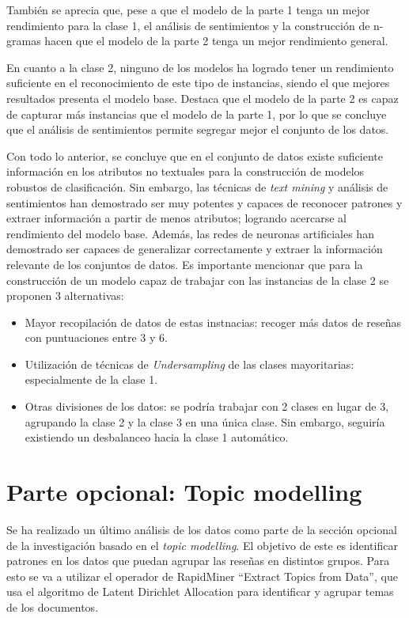 \documentclass[es]{uc3mreport}
\begin{document}
\begin{report}
También se aprecia que, pese a que el modelo de la parte 1 tenga un mejor
rendimiento para la clase 1, el análisis de sentimientos y la construcción de
n-gramas hacen que el modelo de la parte 2 tenga un mejor rendimiento general.

En cuanto a la clase 2, ninguno de los modelos ha logrado tener un rendimiento
suficiente en el reconocimiento de este tipo de instancias, siendo el que
mejores resultados presenta el modelo base. Destaca que el modelo de la parte 2
es capaz de capturar más instancias que el modelo de la parte 1, por lo que se
concluye que el análisis de sentimientos permite segregar mejor el conjunto de
los datos.

Con todo lo anterior, se concluye que en el conjunto de datos existe suficiente
información en los atributos no textuales para la construcción de modelos
robustos de clasificación. Sin embargo, las técnicas de \textit{text mining} y
análisis de sentimientos han demostrado ser muy potentes y capaces de reconocer
patrones y extraer información a partir de menos atributos; logrando acercarse
al rendimiento del modelo base. Además, las redes de neuronas artificiales han
demostrado ser capaces de generalizar correctamente y extraer la información
relevante de los conjuntos de datos. Es importante mencionar que para la
construcción de un modelo capaz de trabajar con las instancias de la clase 2 se
proponen 3 alternativas:

\begin{itemize}
    \item Mayor recopilación de datos de estas instnacias: recoger más datos de
    reseñas con puntuaciones entre 3 y 6.
    \item Utilización de técnicas de \textit{Undersampling} de las clases
    mayoritarias: especialmente de la clase 1.
    \item Otras divisiones de los datos: se podría trabajar con 2 clases en
    lugar de 3, agrupando la clase 2 y la clase 3 en una única clase. Sin
    embargo, seguiría existiendo un desbalanceo hacia la clase 1
    automático.
\end{itemize}

\section{Parte opcional: Topic modelling}
\label{chap:topic}

Se ha realizado un último análisis de los datos como parte de la sección
opcional de la investigación basado en el \textit{topic modelling}. El objetivo de este
es identificar patrones en los datos que puedan agrupar las reseñas en
distintos grupos. Para esto se va a utilizar el operador de RapidMiner “Extract
Topics from Data”, que usa el algoritmo de Latent Dirichlet Allocation para
identificar y agrupar temas de los documentos.


\end{report}
\end{document}
